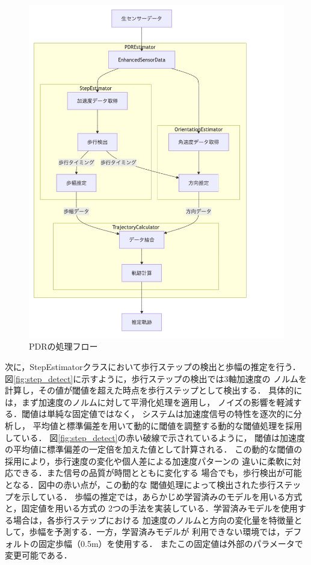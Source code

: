 \begin{figure}[H]
    \centering
    \includegraphics[width=\linewidth]{../image/pdr_flow2.png}
    \caption{PDRの処理フロー}
    \label{fig:pdr-flow}
\end{figure}


次に，StepEstimatorクラスにおいて歩行ステップの検出と歩幅の推定を行う．
図\ref{fig:step_detect}に示すように，歩行ステップの検出では3軸加速度の
ノルムを計算し，その値が閾値を超えた時点を歩行ステップとして検出する．
具体的には，まず加速度のノルムに対して平滑化処理を適用し，
ノイズの影響を軽減する．閾値は単純な固定値ではなく，
システムは加速度信号の特性を逐次的に分析し，
平均値と標準偏差を用いて動的に閾値を調整する動的な閾値処理を採用している．
図\ref{fig:step_detect}の赤い破線で示されているように，
閾値は加速度の平均値に標準偏差の一定倍を加えた値として計算される．
この動的な閾値の採用により，歩行速度の変化や個人差による加速度パターンの
違いに柔軟に対応できる．また信号の品質が時間とともに変化する  %
場合でも，歩行検出が可能となる．図中の赤い点が，この動的な
閾値処理によって検出された歩行ステップを示している．
歩幅の推定では，あらかじめ学習済みのモデルを用いる方式と，固定値を用いる方式の
2つの手法を実装している．学習済みモデルを使用する場合は，各歩行ステップにおける
加速度のノルムと方向の変化量を特徴量として，歩幅を予測する．一方，学習済みモデルが
利用できない環境では，デフォルトの固定歩幅（0.5m）を使用する．
またこの固定値は外部のパラメータで変更可能である．

